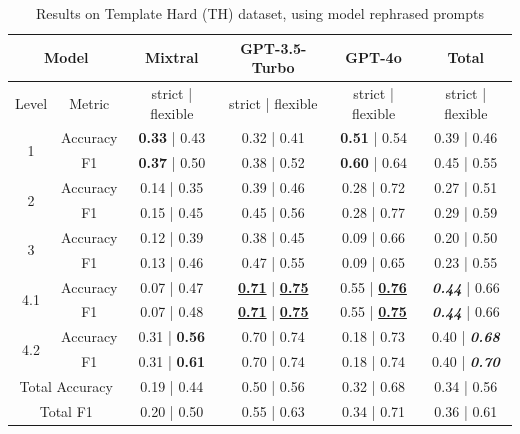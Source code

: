 \documentclass[runningheads]{llncs}
\begin{document}
\begin{table}[!bt]
\centering
\caption{Results on Template Hard (TH) dataset, using model rephrased prompts}
\begin{tabular}{cc|c|c|c|c}
\hline \hline
\multicolumn{2}{c|}{Model}  				& Mixtral & GPT-3.5-Turbo & GPT-4o & Total \\
\hline
Level & Metric                      & strict | flexible          & strict | flexible  & strict | flexible & strict | flexible       \\
\hline \hline
\multirow{2}{*}{1}     & Accuracy &	\textbf{0.33} | 0.43 &	0.32 | 0.41 & \textbf{0.51} | 0.54 & 0.39 | 0.46  \\
      & F1	     &  \textbf{0.37} | 0.50	& 0.38 | 0.52 &	 \textbf{0.60}  | 0.64 & 0.45 | 0.55\\
			\hline
\multirow{2}{*}{2}			& Accuracy &	0.14 | 0.35 &	0.39 | 0.46 &	0.28 | 0.72 & 0.27 | 0.51 \\
		  & F1	     &  0.15 | 0.45	& 0.45 | 0.56	& 0.28 | 0.77 & 0.29 | 0.59 \\
			\hline
\multirow{2}{*}{3}			& Accuracy & 0.12 | 0.39 &	0.38 | 0.45 &	0.09 | 0.66 & 0.20 | 0.50 \\
		  & F1	     &  0.13 | 0.46	& 0.47 | 0.55 &	0.09 | 0.65 & 0.23 | 0.55\\
			\hline
\multirow{2}{*}{4.1}   & Accuracy & 0.07 | 0.47	& \underline{\textbf{0.71}} | \underline{\textbf{0.75}}	& 0.55 | \underline{\textbf{0.76}} & \textit{\textbf{0.44}} | 0.66 \\
										   & F1       &	0.07 | 0.48	& \underline{\textbf{0.71}} | \underline{\textbf{0.75}}	&0.55 | \underline{\textbf{0.75}} & \textit{\textbf{0.44}} | 0.66 \\
			\hline
\multirow{2}{*}{4.2}   & Accuracy &	0.31 | \textbf{0.56}	& 0.70 | 0.74	& 0.18 | 0.73 & 0.40 | \textit{\textbf{0.68}} \\
											 & F1       &	0.31 | \textbf{0.61}	& 0.70 | 0.74	& 0.18 | 0.74 & 0.40 | \textit{\textbf{0.70}} \\
\hline \hline
\multicolumn{2}{c|}{Total Accuracy}	& 0.19 | 0.44 &	0.50 | 0.56 &	0.32 | 0.68 & 0.34 | 0.56 \\
\multicolumn{2}{c|}{Total F1}  	      & 0.20 | 0.50	& 0.55 | 0.63 &	0.34 | 0.71 & 0.36 | 0.61 \\
 \hline \hline
\end{tabular}
\label{tbl:TH-modelrephrased}
\end{table}
\end{document}
